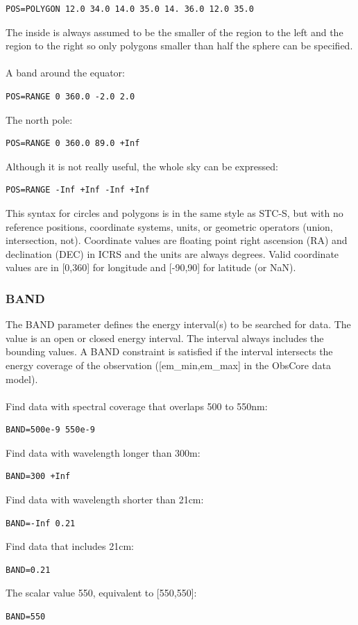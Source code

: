\documentclass[11pt,a4paper]{ivoa}
\begin{document}
\begin{lstlisting}
POS=POLYGON 12.0 34.0 14.0 35.0 14. 36.0 12.0 35.0
\end{lstlisting}

The inside is always assumed to be the smaller of the region to the left and the region to the right so only polygons smaller than half the sphere can be specified. \\ \\
A band around the equator: 

\begin{lstlisting}
POS=RANGE 0 360.0 -2.0 2.0 
\end{lstlisting}
The north pole: 

\begin{lstlisting}
POS=RANGE 0 360.0 89.0 +Inf 
\end{lstlisting}
Although it is not really useful, the whole sky can be expressed:



\begin{lstlisting}
POS=RANGE -Inf +Inf -Inf +Inf
\end{lstlisting}


This syntax for circles and polygons is in the same style as STC-S, but with no reference positions, coordinate systems, units, or geometric operators (union, intersection, not). Coordinate values are floating point right ascension (RA) and declination (DEC) in ICRS and the units are always degrees. Valid coordinate values are in [0,360] for longitude and [-90,90] for latitude (or NaN).

\subsubsection{BAND}
\label{sec:BAND}

The BAND parameter defines the energy interval(s) to be searched for data. The value is an open or closed energy interval. The interval always includes the bounding values. A BAND constraint is satisfied if the interval intersects the energy coverage of the observation ([em\_min,em\_max] in the ObsCore data model). \\ \\
Find data with spectral coverage that overlaps 500 to 550nm:

\begin{lstlisting}
BAND=500e-9 550e-9
\end{lstlisting}
Find data with wavelength longer than 300m:
\begin{lstlisting}
BAND=300 +Inf
\end{lstlisting}
Find data with wavelength shorter than 21cm:
\begin{lstlisting}
BAND=-Inf 0.21
\end{lstlisting}
Find data that includes 21cm:
\begin{lstlisting}
BAND=0.21
\end{lstlisting}
The scalar value 550, equivalent to [550,550]:
\begin{lstlisting}
BAND=550
\end{lstlisting}
\end{document}
